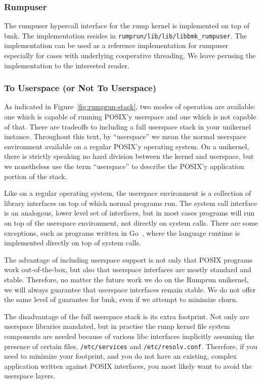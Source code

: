 \subsubsection{Rumpuser}

The rumpuser hypercall interface for the rump kernel is
implemented on top of bmk.  The implementation resides in
\verb+rumprun/lib/lib/libbmk_rumpuser+.  The implementation can be used
as a reference implementation for rumpuser especially for cases with
underlying cooperative threading.  We leave perusing the implementation
to the interested reader.


\subsubsection{To Userspace (or Not To Userspace)}

As indicated in Figure~\ref{fig:rumprun-stack}, two modes of operation
are available: one which is capable of running POSIX'y userspace and one
which is not capable of that.
There are tradeoffs to including a full userspace stack in your unikernel
instance.  Throughout this text, by ``userspace'' we mean the normal
userspace environment available on a regular POSIX'y operating system.
On a unikernel, there is strictly speaking no hard division between
the kernel and userspace, but we nonetheless use the term ``userspace''
to describe the POSIX'y application portion of the stack.

Like on a regular operating system, the userspace environment is a
collection of library interfaces on top of which normal programs run.
The system call interface is an analogous, lower level set of interfaces, but
in most cases programs will run on top of the userspace environment,
not directly on system calls.  There are some exceptions, such as programs
written in Go~\cite{golang}, where the language runtime is implemented
directly on top of system calls.

The advantage of including userspace support is not only that POSIX
programs work out-of-the-box, but also that userspace interfaces are
mostly standard and stable.  Therefore, no matter the future work we
do on the Rumprun unikernel, we will always guarantee that
userspace interfaces remain stable.  We do not offer the same level
of guarantee for bmk, even if we attempt to minimize churn.

The disadvantage of the full userspace stack is its extra footprint.
Not only are userspace libraries mandated, but in practise the
rump kernel file system components are needed because of various
libc interfaces implicitly assuming the presence of certain
files, \eg \texttt{/etc/services} and \texttt{/etc/resolv.conf}.
Therefore, if you need to minimize your footprint, and you do not
have an existing, complex application written against POSIX interfaces,
you most likely want to avoid the userspace layers.


